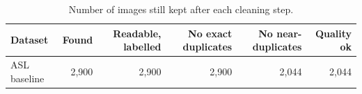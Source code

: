 \begin{table}[htbp]
\centering\small
\caption{Number of images still kept after each cleaning step.}
\label{tab:cleaning-counts}
\begin{tabular}{lrrrrr}
\toprule
Dataset & Found & Readable, labelled & No exact duplicates & No near-duplicates & Quality ok \\
\midrule
ASL baseline & 2{,}900 & 2{,}900 & 2{,}900 & 2{,}044 & 2{,}044 \\
\bottomrule
\end{tabular}
\end{table}
